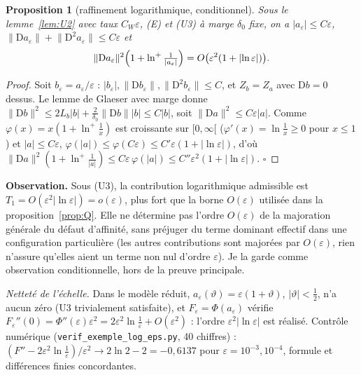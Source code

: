 \documentclass[11pt,a4paper]{article}
\newtheorem{proposition}[theoreme]{Proposition}
\theoremstyle{remark}
\newcommand{\vth}{\vartheta}
\newcommand{\D}{\mathrm D}
\begin{document}
\begin{proposition}[raffinement logarithmique, conditionnel]\label{prop:log}
Sous le lemme~\ref{lem:U2} avec taux $C_W\varepsilon$, (E) et (U3) à marge $\delta_0$ fixe, on a $\lvert a_\varepsilon\rvert\le C\varepsilon$, $\lVert\D a_\varepsilon\rVert+\lVert\D^2a_\varepsilon\rVert\le C\varepsilon$ et
\[
\lVert\D a_\varepsilon\rVert^2\Bigl(1+\ln^+\tfrac1{\lvert a_\varepsilon\rvert}\Bigr)=O\bigl(\varepsilon^2(1+\lvert\ln\varepsilon\rvert)\bigr).
\]
\end{proposition}
\begin{proof}
Soit $b_\varepsilon=a_\varepsilon/\varepsilon$ : $\lvert b_\varepsilon\rvert,\lVert\D b_\varepsilon\rVert,\lVert\D^2b_\varepsilon\rVert\le C$, et $Z_b=Z_a$ avec $\D b=0$ dessus. Le lemme de Glaeser avec marge donne $\lVert\D b\rVert^2\le2L_b\lvert b\rvert+\frac2{\delta_0}\lVert\D b\rVert\lvert b\rvert\le C\lvert b\rvert$, soit $\lVert\D a\rVert^2\le C\varepsilon\lvert a\rvert$. Comme $\varphi(x)=x(1+\ln^+\frac1x)$ est croissante sur $[0,\infty[$ ($\varphi'(x)=\ln\frac1x\ge0$ pour $x\le1$) et $\lvert a\rvert\le C\varepsilon$, $\varphi(\lvert a\rvert)\le\varphi(C\varepsilon)\le C'\varepsilon(1+\lvert\ln\varepsilon\rvert)$, d'où $\lVert\D a\rVert^2(1+\ln^+\frac1{\lvert a\rvert})\le C\varepsilon\,\varphi(\lvert a\rvert)\le C''\varepsilon^2(1+\lvert\ln\varepsilon\rvert)$. $\square$
\end{proof}
\noindent \textbf{Observation.} Sous (U3), la contribution logarithmique admissible est $T_1=O(\varepsilon^2|\ln\varepsilon|)=o(\varepsilon)$, plus fort que la borne $O(\varepsilon)$ utilisée dans la proposition~\ref{prop:Q}. Elle ne détermine pas l'ordre $O(\varepsilon)$ de la majoration générale du défaut d'affinité, sans préjuger du terme dominant effectif dans une configuration particulière (les autres contributions sont majorées par $O(\varepsilon)$, rien n'assure qu'elles aient un terme non nul d'ordre $\varepsilon$). Je la garde comme observation conditionnelle, hors de la preuve principale.

\emph{Netteté de l'échelle.} Dans le modèle réduit, $a_\varepsilon(\vth)=\varepsilon(1+\vth)$, $\lvert\vth\rvert<\frac12$, n'a aucun zéro (U3 trivialement satisfaite), et $F_\varepsilon=\Phi(a_\varepsilon)$ vérifie $F_\varepsilon''(0)=\Phi''(\varepsilon)\varepsilon^2=2\varepsilon^2\ln\frac1\varepsilon+O(\varepsilon^2)$ : l'ordre $\varepsilon^2|\ln\varepsilon|$ est réalisé. Contrôle numérique (\texttt{verif\_exemple\_log\_eps.py}, 40 chiffres) : $(F''-2\varepsilon^2\ln\frac1\varepsilon)/\varepsilon^2\to2\ln2-2=-0{,}6137$ pour $\varepsilon=10^{-3},10^{-4}$, formule et différences finies concordantes.
\end{document}
